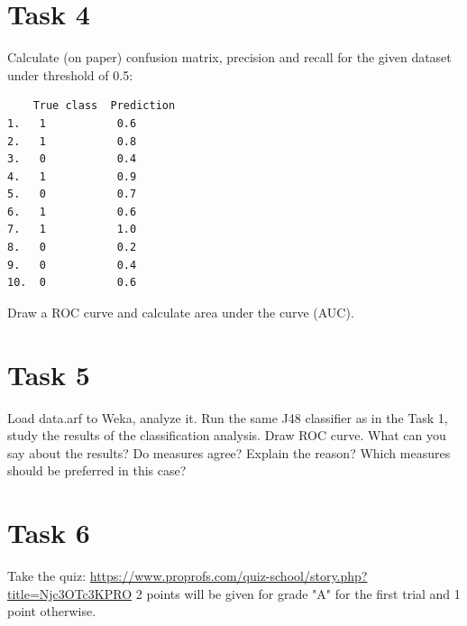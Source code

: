 \documentclass{article}
\begin{document}
\section*{Task 4}
Calculate (on paper) confusion matrix, precision and recall for the given dataset under threshold of 0.5:
\begin{verbatim}
    True class  Prediction
1.   1           0.6
2.   1           0.8
3.   0           0.4	
4.   1           0.9
5.   0           0.7
6.   1           0.6
7.   1           1.0
8.   0           0.2
9.   0           0.4
10.  0           0.6
\end{verbatim}

Draw a ROC curve and calculate area under the curve (AUC).

\section*{Task 5}
Load data.arf to Weka, analyze it. Run the same J48 classifier as in the Task 1, study the results of the classification analysis. Draw ROC curve. What can you say about the results? Do measures agree? Explain the reason? Which measures should be preferred in this case?

\section*{Task 6}
Take the quiz: \url{https://www.proprofs.com/quiz-school/story.php?title=Njc3OTc3KPRO}
2 points will be given for grade "A" for the first trial and 1 point otherwise. 
\end{document}
